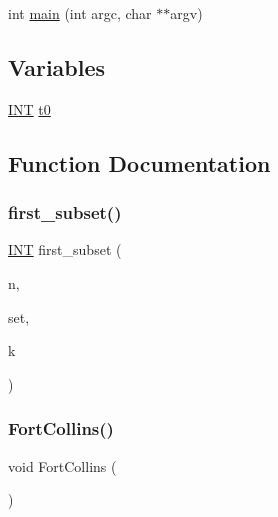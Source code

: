 \begin{DoxyCompactItemize}
\item 
int \mbox{\hyperlink{test2_8_c_a3c04138a5bfe5d72780bb7e82a18e627}{main}} (int argc, char $\ast$$\ast$argv)
\end{DoxyCompactItemize}
\subsection*{Variables}
\begin{DoxyCompactItemize}
\item 
\mbox{\hyperlink{galois_8h_a09fddde158a3a20bd2dcadb609de11dc}{I\+NT}} \mbox{\hyperlink{test2_8_c_a4268f4fe222ffb119218a0199f5e1904}{t0}}
\end{DoxyCompactItemize}


\subsection{Function Documentation}
\mbox{\label{test2_8_c_a838ed3c66baaa59dc15d6e38980840db}} 
\subsubsection{\texorpdfstring{first\+\_\+subset()}{first\_subset()}}
{\footnotesize\ttfamily \mbox{\hyperlink{galois_8h_a09fddde158a3a20bd2dcadb609de11dc}{I\+NT}} first\+\_\+subset (\begin{DoxyParamCaption}\item[{\mbox{\hyperlink{galois_8h_a09fddde158a3a20bd2dcadb609de11dc}{I\+NT}}}]{n,  }\item[{\mbox{\hyperlink{galois_8h_a09fddde158a3a20bd2dcadb609de11dc}{I\+NT}} $\ast$}]{set,  }\item[{\mbox{\hyperlink{galois_8h_a09fddde158a3a20bd2dcadb609de11dc}{I\+NT}} \&}]{k }\end{DoxyParamCaption})}

\mbox{\label{test2_8_c_a538294936b938a17217afb60c01960c0}} 
\subsubsection{\texorpdfstring{Fort\+Collins()}{FortCollins()}}
{\footnotesize\ttfamily void Fort\+Collins (\begin{DoxyParamCaption}{ }\end{DoxyParamCaption})}

